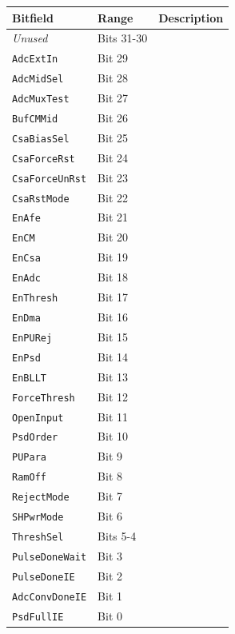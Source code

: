 \begin{tabularx}{\textwidth}{ l l l X }
\textbf{Bitfield} & \textbf{Range} & \multicolumn{2}{X}{\textbf{Description}} \\ \hline
\textit{Unused} & Bits 31-30 & \multicolumn{2}{X}{} \\
\hline
\texttt{AdcExtIn} & Bit 29 & \multicolumn{2}{X}{} \\
\hline
\texttt{AdcMidSel} & Bit 28 & \multicolumn{2}{X}{} \\
\hline
\texttt{AdcMuxTest} & Bit 27 & \multicolumn{2}{X}{} \\
\hline
\texttt{BufCMMid} & Bit 26 & \multicolumn{2}{X}{} \\
\hline
\texttt{CsaBiasSel} & Bit 25 & \multicolumn{2}{X}{} \\
\hline
\texttt{CsaForceRst} & Bit 24 & \multicolumn{2}{X}{} \\
\hline
\texttt{CsaForceUnRst} & Bit 23 & \multicolumn{2}{X}{} \\
\hline
\texttt{CsaRstMode} & Bit 22 & \multicolumn{2}{X}{} \\
\hline
\texttt{EnAfe} & Bit 21 & \multicolumn{2}{X}{} \\
\hline
\texttt{EnCM} & Bit 20 & \multicolumn{2}{X}{} \\
\hline
\texttt{EnCsa} & Bit 19 & \multicolumn{2}{X}{} \\
\hline
\texttt{EnAdc} & Bit 18 & \multicolumn{2}{X}{} \\
\hline
\texttt{EnThresh} & Bit 17 & \multicolumn{2}{X}{} \\
\hline
\texttt{EnDma} & Bit 16 & \multicolumn{2}{X}{} \\
\hline
\texttt{EnPURej} & Bit 15 & \multicolumn{2}{X}{} \\
\hline
\texttt{EnPsd} & Bit 14 & \multicolumn{2}{X}{} \\
\hline
\texttt{EnBLLT} & Bit 13 & \multicolumn{2}{X}{} \\
\hline
\texttt{ForceThresh} & Bit 12 & \multicolumn{2}{X}{} \\
\hline
\texttt{OpenInput} & Bit 11 & \multicolumn{2}{X}{} \\
\hline
\texttt{PsdOrder} & Bit 10 & \multicolumn{2}{X}{} \\
\hline
\texttt{PUPara} & Bit 9 & \multicolumn{2}{X}{} \\
\hline
\texttt{RamOff} & Bit 8 & \multicolumn{2}{X}{} \\
\hline
\texttt{RejectMode} & Bit 7 & \multicolumn{2}{X}{} \\
\hline
\texttt{SHPwrMode} & Bit 6 & \multicolumn{2}{X}{} \\
\hline
\texttt{ThreshSel} & Bits 5-4 & \multicolumn{2}{X}{} \\
\hline
\texttt{PulseDoneWait} & Bit 3 & \multicolumn{2}{X}{} \\
\hline
\texttt{PulseDoneIE} & Bit 2 & \multicolumn{2}{X}{} \\
\hline
\texttt{AdcConvDoneIE} & Bit 1 & \multicolumn{2}{X}{} \\
\hline
\texttt{PsdFullIE} & Bit 0 & \multicolumn{2}{X}{} \\
\hline
\end{tabularx}

